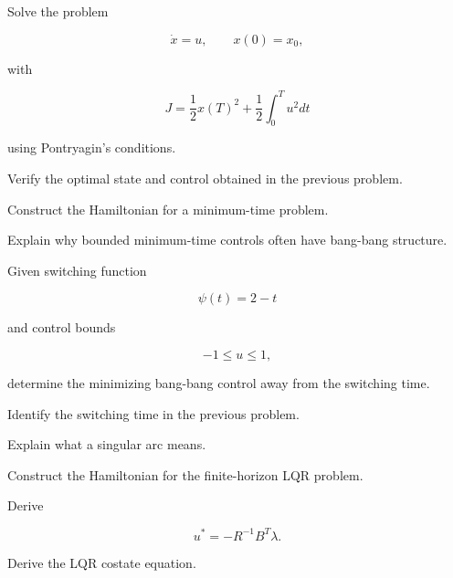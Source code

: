 \begin{exercise}[3]
Solve the problem

\[
\dot{x}=u,
\qquad
x(0)=x_0,
\]

with

\[
J
=
\frac12x(T)^2
+
\frac12
\int_0^Tu^2dt
\]

using Pontryagin's conditions.
\end{exercise}

\begin{exercise}[3]
Verify the optimal state and control obtained in the previous problem.
\end{exercise}

\begin{exercise}[3]
Construct the Hamiltonian for a minimum-time problem.
\end{exercise}

\begin{exercise}[3]
Explain why bounded minimum-time controls often have bang-bang structure.
\end{exercise}

\begin{exercise}[3]
Given switching function

\[
\psi(t)=2-t
\]

and control bounds

\[
-1\leq u\leq1,
\]

determine the minimizing bang-bang control away from the switching time.
\end{exercise}

\begin{exercise}[3]
Identify the switching time in the previous problem.
\end{exercise}

\begin{exercise}[3]
Explain what a singular arc means.
\end{exercise}

\begin{exercise}[3]
Construct the Hamiltonian for the finite-horizon LQR problem.
\end{exercise}

\begin{exercise}[3]
Derive

\[
u^*
=
-R^{-1}B^T\lambda.
\]
\end{exercise}

\begin{exercise}[3]
Derive the LQR costate equation.
\end{exercise}


